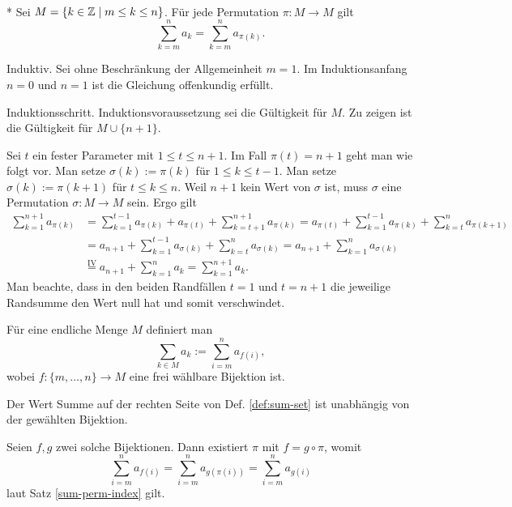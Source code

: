 \newpage
\begin{Satz}%
\label{sum-perm-index}\mbox{}\\*
Sei $M=\{k\in\mathbb Z\mid m\le k\le n\}$. Für jede Permutation $\pi\colon M\to M$ gilt
\[\sum_{k=m}^n a_k = \sum_{k=m}^n a_{\pi(k)}.\]
\end{Satz}
\begin{Beweis} Induktiv. Sei ohne Beschränkung der Allgemeinheit $m=1$.
Im Induktionsanfang $n=0$ und $n=1$ ist die Gleichung offenkundig erfüllt.

Induktionsschritt. Induktionsvoraussetzung sei die Gültigkeit für $M$.
Zu zeigen ist die Gültigkeit für $M\cup\{n+1\}$.

Sei $t$ ein fester Parameter mit $1\le t\le n+1$.
Im Fall $\pi(t) = n+1$ geht man wie folgt vor.
Man setze $\sigma(k):=\pi(k)$ für $1\le k\le t-1$. Man setze
$\sigma(k):=\pi(k+1)$ für $t\le k\le n$. Weil $n+1$ kein Wert von
$\sigma$ ist, muss $\sigma$ eine Permutation $\sigma\colon M\to M$ sein.
Ergo gilt
\begin{align*}
\sum_{k=1}^{n+1} a_{\pi(k)} &= \sum_{k=1}^{t-1} a_{\pi(k)}
+ a_{\pi(t)} + \sum_{k=t+1}^{n+1} a_{\pi(k)}
= a_{\pi(t)} + \sum_{k=1}^{t-1} a_{\pi(k)}
+ \sum_{k=t}^n a_{\pi(k+1)}\\
&= a_{n+1} + \sum_{k=1}^{t-1} a_{\sigma(k)}
+ \sum_{k=t}^n a_{\sigma(k)}
= a_{n+1} + \sum_{k=1}^n a_{\sigma(k)}\\
&\stackrel{\mathrm{IV}}= a_{n+1} + \sum_{k=1}^n a_k
= \sum_{k=1}^{n+1} a_k.
\end{align*}
Man beachte, dass in den beiden Randfällen $t=1$ und $t=n+1$ die
jeweilige Randsumme den Wert null hat und somit verschwindet.\,\qedsymbol
\end{Beweis}

\begin{Definition}\label{def:sum-set}
Für eine endliche Menge $M$ definiert man
\[\sum_{k\in M} a_k := \sum_{i=m}^n a_{f(i)},\]
wobei $f\colon \{m,\ldots,n\}\to M$ eine frei wählbare Bijektion ist.
\end{Definition}

\begin{Korollar}\label{sum-set-well-defined}
Der Wert Summe auf der rechten Seite von Def. \ref{def:sum-set}
ist unabhängig von der gewählten Bijektion.
\end{Korollar}
\begin{Beweis} Seien $f,g$ zwei solche Bijektionen. Dann existiert
$\pi$ mit $f=g\circ\pi$, womit%
\[\sum_{i=m}^n a_{f(i)} = \sum_{i=m}^n a_{g(\pi(i))} =
\sum_{i=m}^n a_{g(i)}\]
laut Satz \ref{sum-perm-index} gilt.\,\qedsymbol
\end{Beweis}

